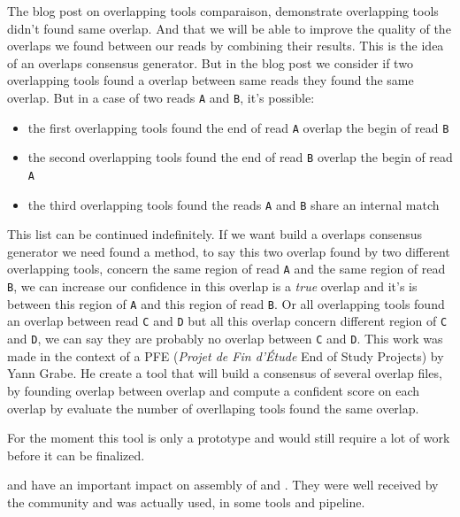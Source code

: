 \documentclass[main.tex]{subfiles}
\begin{document}
The blog post on overlapping tools comparaison, demonstrate overlapping tools didn't found same overlap. And that we will be able to improve the quality of the overlaps we found between our reads by combining their results. This is the idea of an overlaps consensus generator. But in the blog post we consider if two overlapping tools found a overlap between same reads they found the same overlap. But in a case of two reads \texttt{A} and \texttt{B}, it's possible:
\begin{itemize}
    \item the first overlapping tools found the end of read \texttt{A} overlap the begin of read \texttt{B}
    \item the second overlapping tools found the end of read \texttt{B} overlap the begin of read \texttt{A}
    \item the third overlapping tools found the reads \texttt{A} and \texttt{B} share an internal match
\end{itemize}

This list can be continued indefinitely. If we want build a overlaps consensus generator we need found a method, to say this two overlap found by two different overlapping tools, concern the same region of read \texttt{A} and the same region of read \texttt{B}, we can increase our confidence in this overlap is a \textit{true} overlap and it's is between this region of \texttt{A} and this region of read \texttt{B}. Or all overlapping tools found an overlap between read \texttt{C} and \texttt{D} but all this overlap concern different region of \texttt{C} and \texttt{D}, we can say they are probably no overlap between \texttt{C} and \texttt{D}.
This work was made in the context of a PFE (\textit{Projet de Fin d'Étude} End of Study Projects) by Yann Grabe. He create a tool that will build a consensus of several overlap files, by founding overlap between overlap and compute a confident score on each overlap by evaluate the number of overllaping tools found the same overlap.

For the moment this tool is only a prototype and would still require a lot of work before it can be finalized. 

\yacrd and \fpa have an important impact on assembly of \miniasm and \wtdbg. They were well received by the community \yacrd and \fpa was actually used, in some tools and pipeline.


%
%
\end{document}
